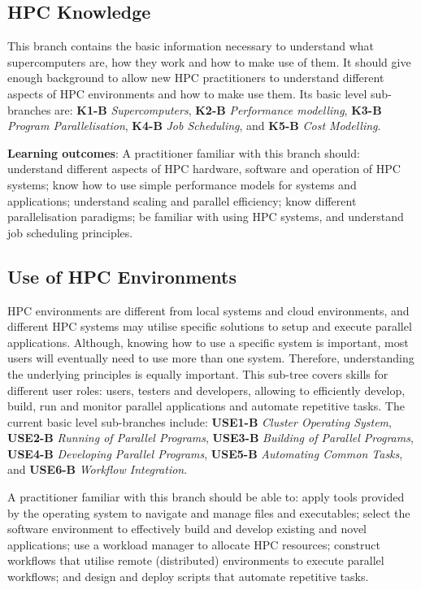 \documentclass[jocse]{jocseart}
\begin{document}
\subsection{HPC Knowledge}

This branch contains the basic information necessary to understand what supercomputers are, how they work and how to make use of them. It should give enough background to allow new HPC practitioners to understand different aspects of HPC environments and how to make use them. Its basic level sub-branches are: \textbf{K1-B} \textit{Supercomputers}, \textbf{K2-B} \textit{Performance modelling}, \textbf{K3-B} \textit{Program Parallelisation}, \textbf{K4-B} \textit{Job Scheduling}, and \textbf{K5-B} \textit{Cost Modelling}. 

\textbf{Learning outcomes}: A practitioner familiar with this branch should: understand different aspects of HPC hardware, software and operation of HPC systems; know how to use simple performance models for systems and applications; understand scaling and parallel efficiency; know different parallelisation paradigms; be familiar with using HPC systems, and understand job scheduling principles.

\subsection{Use of HPC Environments}

HPC environments are different from local systems and cloud environments, and different HPC systems may utilise  specific solutions to setup and execute parallel applications. Although, knowing how to use a specific system is important, most users will eventually need to use more than one system. Therefore, understanding the underlying principles is equally important. This sub-tree covers skills for different user roles: users, testers and developers, allowing to efficiently develop, build, run and monitor parallel applications and automate repetitive tasks. The current basic level sub-branches include: \textbf{USE1-B} \textit{Cluster Operating System}, \textbf{USE2-B} \textit{Running of Parallel Programs}, \textbf{USE3-B} \textit{Building of Parallel Programs}, \textbf{USE4-B} \textit{Developing Parallel Programs}, \textbf{USE5-B} \textit{Automating Common Tasks}, and \textbf{USE6-B} \textit{Workflow Integration}. 

A practitioner familiar with this branch should be able to: apply tools provided by the operating system to navigate and manage files and executables; select the software environment to effectively build and develop existing and novel applications; use a workload manager to allocate HPC resources; construct workflows that utilise remote (distributed) environments to execute parallel workflows; and design and deploy scripts that automate repetitive tasks.
\end{document}
